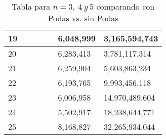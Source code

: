 \begin{table}[H]
{\begin{tabular}{ |l|l|l|l|l|l|l| }
  19&			{}&			{}&			{}&			{}&	6,048,999&	3,165,594,743 \\ \hline
  20&			{}&			{}&			{}&			{}&	6,283,413&	3,781,117,314 \\ \hline
  21&			{}&			{}&			{}&			{}&	6,259,904&	5,603,863,234 \\ \hline
  22&			{}&			{}&			{}&			{}&	6,193,765&	9,993,456,118 \\ \hline
  23&			{}&			{}&			{}&			{}&	6,006,958&	14,970,489,604 \\ \hline
  24&			{}&			{}&			{}&			{}&	5,502,917&	18,238,644,771 \\ \hline
  25&			{}&			{}&			{}&			{}&	8,168,827&	32,265,934,044 \\ \hline
\end{tabular}
 \caption*{Tabla para $n=3,\ 4\ y\ 5$ comparando con Podas vs. sin Podas}
}
\end{table}